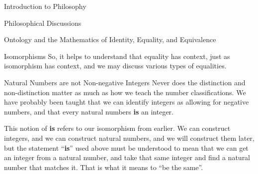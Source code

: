 \begin{chapter}{Introduction to Philosophy}
\begin{section}{Philosophical Discussions}
\begin{subsection}{Ontology and the Mathematics of Identity, Equality, and Equivalence}
\begin{subsubsection}{Isomorphisms}
                So, it helps to understand that equality has context, just as isomorphism has context, and we may discuss various types of equalities.
            \end{subsubsection}
                
            \begin{subsubsection}{Natural Numbers are not Non-negative Integers}
                Never does the distinction and non-distinction matter as much as how we teach the number classifications. We have probably been taught that we can identify integers as allowing for negative numbers, and that every natural numbers \textbf{is} an integer.
                    
                This notion of \textbf{is} refers to our isomorphism from earlier. We can construct integers, and we can construct natural numbers, and we will construct them later, but the statement ``\textbf{is}'' used above must be understood to mean that we can get an integer from a natural number, and take that same integer and find a natural number that matches it. That is what it means to ``be the same''.
            \end{subsubsection}
        \end{subsection}
    \end{section}
\end{chapter}